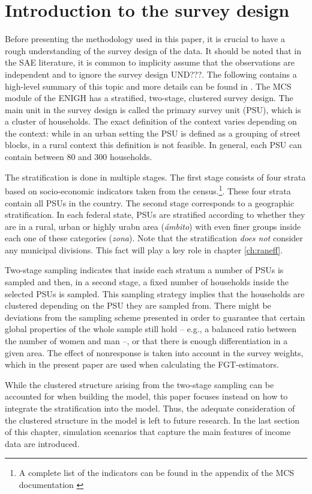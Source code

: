 \section{Introduction to the survey design}
\label{ch:design}

Before presenting the methodology used in this paper, it is crucial to have a rough understanding of the survey design of the data.
It should be noted that in the SAE literature, it is common to implicity assume that the observations are independent and to ignore the survey design \citep{rojas_perilla_data_2020} UND???.
The following contains a high-level summary of this topic and more details can be found in \cite{inegi_modulo_2011}.
The MCS module of the ENIGH has a stratified, two-stage, clustered survey design.
The main unit in the survey design is called the primary survey unit (PSU), which is a cluster of households.
The exact definition of the context varies depending on the context:
while in an urban setting the PSU is defined as a grouping of street blocks, in a rural context this definition is not feasible.
In general, each PSU can contain between 80 and 300 households.

The stratification is done in multiple stages.
The first stage consists of four strata based on socio-economic indicators taken from the census.\footnote{A complete list of the indicators can be found in the appendix of the MCS documentation \citep{inegi_modulo_2011}}. These four strata contain all PSUs in the country.
The second stage corresponds to a geographic stratification.
In each federal state, PSUs are stratified according to whether they are in a rural, urban or highly urabn area (\textit{ámbito}) with even finer groups inside each one of these categories (\textit{zona}).
Note that the stratification \textit{does not} consider any municipal divisions.
This fact will play a key role in chapter \ref{ch:raneff}.

Two-stage sampling indicates that inside each stratum a number of PSUs is sampled and then, in a second stage, a fixed number of households inside the selected PSUs is sampled.
This sampling strategy implies that the households are clustered depending on the PSU they are sampled from.
There might be deviations from the sampling scheme presented in order to guarantee that certain global properties of the whole sample still hold – e.g., a balanced ratio between the number of women and man –, or that there is enough differentiation in a given area.
The effect of nonresponse is taken into account in the survey weights, which in the present paper are used when calculating the FGT-estimators.

While the clustered structure arising from the two-stage sampling can be accounted for when building the model, this paper focuses instead on how to integrate the stratification into the model.
Thus, the adequate consideration of the clustered structure in the model is left to future research.
In the last section of this chapter, simulation scenarios that capture the main features of income data are introduced.



